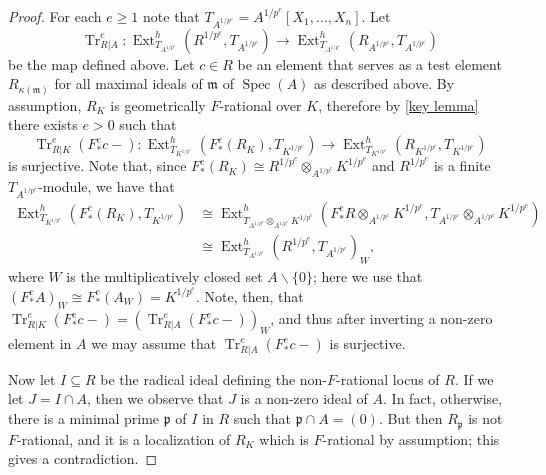 \documentclass[reqno,11pt]{amsart}
\numberwithin{equation}{section}
\theoremstyle{definition}
\theoremstyle{definition}
\theoremstyle{definition}
\theoremstyle{remark}
\newcommand{\Spec}{\operatorname{Spec}}
\newcommand{\Ext}{\operatorname{Ext}}
\newcommand{\Tr}{\operatorname{Tr}}
\newcommand{\fm}{\mathfrak{m}}
\newcommand{\fp}{\mathfrak{p}}
\begin{document}
\begin{proof}
    
    For each $e\geq 1$ note that $T_{A^{1/p^e}}=A^{1/p^e}[X_1,\ldots,X_n]$. Let
    \[
    \Tr^e_{R|A}\colon  \Ext^h_{T_{A^{1/p^e}}}(R^{1/p^e},T_{A^{1/p^e}}) \to \Ext^h_{T_{A^{1/p^e}}}(R_{A^{1/p^e}},T_{A^{1/p^e}})
    \]
    be the map defined above. Let $c\in R$ be an element that serves as a test element $R_{\kappa(\fm)}$ for all maximal ideals of $\fm$ of $\Spec(A)$ as described above. By assumption, $R_K$ is geometrically $F$-rational over $K$, therefore by \cref{key lemma} there exists $e>0$ such that 
    \[
    \Tr^e_{R|K}(F^e_*c -) \colon  \Ext^h_{T_{K^{1/p^e}}}(F^e_*(R_K),T_{K^{1/p^e}}) \to \Ext^h_{T_{K^{1/p^e}}}(R_{K^{1/p^e}},T_{K^{1/p^e}})
    \]
    is surjective. Note that, since $F^e_*(R_K) \cong R^{1/p^e} \otimes_{A^{1/p^e}} K^{1/p^e}$ and $R^{1/p^e}$ is a finite $T_{A^{1/p^e}}$-module, we have that 
    \begin{align*}
    \Ext^h_{T_{K^{1/p^e}}}(F^e_*(R_K),T_{K^{1/p^e}})  &\cong \Ext^h_{T_{A^{1/p^e}} \otimes_{A^{1/p^e}} K^{1/p^e}}(F^e_*R \otimes_{A^{1/p^e}} K^{1/p^e},T_{A^{1/p^e}}\otimes_{A^{1/p^e}} K^{1/p^e})\\
    &\cong \Ext^h_{T_{A^{1/p^e}}}(R^{1/p^e},T_{A^{1/p^e}})_W,
    \end{align*}
 where $W$ is the multiplicatively closed set $A \smallsetminus \{0\}$; here we use that $(F^e_*A)_W \cong F^e_*(A_W) = K^{1/p^e}$. Note, then, that $\Tr^e_{R|K}(F^e_*c -) = \left(\Tr^e_{R|A}(F^e_*c -)\right)_W$, and thus after inverting a non-zero element in $A$ we may assume that $\Tr^e_{R|A}(F^e_*c -)$ is surjective. 
    
    Now let $I \subseteq R$ be the radical ideal defining the non-$F$-rational locus of $R$. If we let $J=I \cap A$, then we observe that $J$ is a non-zero ideal of $A$. In fact, otherwise, there is a minimal prime $\fp$ of $I$ in $R$ such that $\fp \cap A = (0)$. But then $R_\fp$ is not $F$-rational, and it is a localization of $R_K$ which is $F$-rational by assumption; this gives a contradiction.
    

\end{proof}
\end{document}
